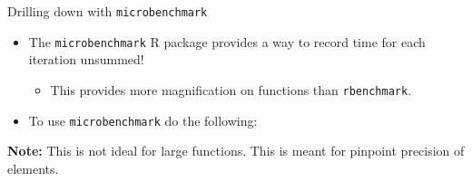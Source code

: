 \begin{frame}[fragile]{Drilling down with \texttt{microbenchmark}}

\begin{itemize}
\tightlist
\item
  The \texttt{microbenchmark} R package provides a way to record time
  for each iteration unsummed!

  \begin{itemize}
  \tightlist
  \item
    This provides more magnification on functions than
    \texttt{rbenchmark}.
  \end{itemize}
\item
  To use \texttt{microbenchmark} do the following:
\end{itemize}

\begin{Shaded}
\begin{Highlighting}[]
\NormalTok{(}\NormalTok{)}

\NormalTok{(} \NormalTok{(), }
                \NormalTok{(), }
                \NormalTok{) }
\end{Highlighting}
\end{Shaded}

\textbf{Note:} This is not ideal for large functions. This is meant for
pinpoint precision of elements.

\end{frame}


